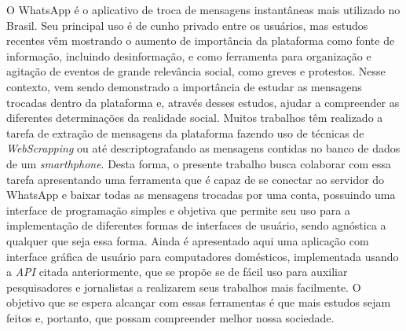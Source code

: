 
O WhatsApp é o aplicativo de troca de mensagens instantâneas mais utilizado no Brasil. Seu principal uso é de cunho privado entre os usuários, mas estudos recentes vêm mostrando o aumento de importância da plataforma como fonte de informação, incluindo desinformação, e como ferramenta para organização e agitação de eventos de grande relevância social, como greves e protestos. Nesse contexto, vem sendo demonstrado a importância de estudar as mensagens trocadas dentro da plataforma e, através desses estudos, ajudar a compreender as diferentes determinações da realidade social. Muitos trabalhos têm realizado a tarefa de extração de mensagens da plataforma fazendo uso de técnicas de \textit{WebScrapping} ou até descriptografando as mensagens contidas no banco de dados de um \textit{smarthphone}. Desta forma, o presente trabalho busca colaborar com essa tarefa apresentando uma ferramenta que é capaz de se conectar ao servidor do WhatsApp e baixar todas as mensagens trocadas por uma conta, possuindo uma interface de programação simples e objetiva que permite seu uso para a implementação de diferentes formas de interfaces de usuário, sendo agnóstica a qualquer que seja essa forma. Ainda é apresentado aqui uma aplicação com interface gráfica de usuário para computadores domésticos, implementada usando a \textit{API} citada anteriormente, que se propõe se de fácil uso para auxiliar pesquisadores e jornalistas a realizarem seus trabalhos mais facilmente. O objetivo que se espera alcançar com essas ferramentas é que mais estudos sejam feitos e, portanto, que possam compreender melhor nossa sociedade.






